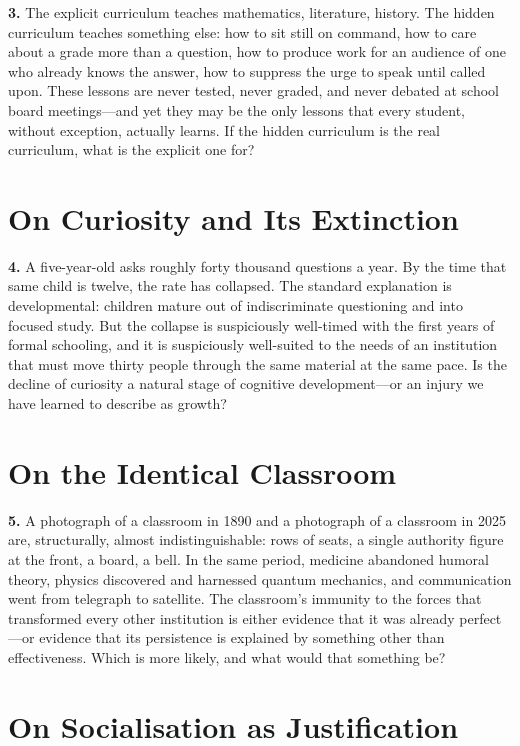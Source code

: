 \documentclass[11pt,letterpaper]{article}
\begin{document}
\textbf{3.}
The explicit curriculum teaches mathematics, literature, history. The hidden curriculum teaches something else: how to sit still on command, how to care about a grade more than a question, how to produce work for an audience of one who already knows the answer, how to suppress the urge to speak until called upon. These lessons are never tested, never graded, and never debated at school board meetings---and yet they may be the only lessons that every student, without exception, actually learns. If the hidden curriculum is the real curriculum, what is the explicit one for?

\section{On Curiosity and Its Extinction}

\textbf{4.}
A five-year-old asks roughly forty thousand questions a year. By the time that same child is twelve, the rate has collapsed. The standard explanation is developmental: children mature out of indiscriminate questioning and into focused study. But the collapse is suspiciously well-timed with the first years of formal schooling, and it is suspiciously well-suited to the needs of an institution that must move thirty people through the same material at the same pace. Is the decline of curiosity a natural stage of cognitive development---or an injury we have learned to describe as growth?

\section{On the Identical Classroom}

\textbf{5.}
A photograph of a classroom in 1890 and a photograph of a classroom in 2025 are, structurally, almost indistinguishable: rows of seats, a single authority figure at the front, a board, a bell. In the same period, medicine abandoned humoral theory, physics discovered and harnessed quantum mechanics, and communication went from telegraph to satellite. The classroom's immunity to the forces that transformed every other institution is either evidence that it was already perfect---or evidence that its persistence is explained by something other than effectiveness. Which is more likely, and what would that something be?

\section{On Socialisation as Justification}
\end{document}
